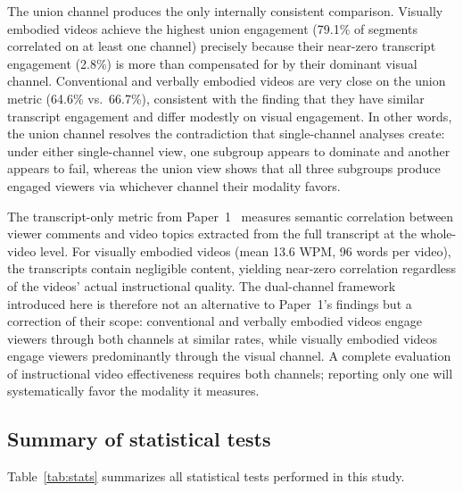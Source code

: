 \documentclass[fleqn,10pt]{wlscirep}
\begin{document}
The union channel produces the only internally consistent comparison. Visually embodied videos achieve the highest union engagement (79.1\% of segments correlated on at least one channel) precisely because their near-zero transcript engagement (2.8\%) is more than compensated for by their dominant visual channel. Conventional and verbally embodied videos are very close on the union metric (64.6\% vs.\ 66.7\%), consistent with the finding that they have similar transcript engagement and differ modestly on visual engagement. In other words, the union channel resolves the contradiction that single-channel analyses create: under either single-channel view, one subgroup appears to dominate and another appears to fail, whereas the union view shows that all three subgroups produce engaged viewers via whichever channel their modality favors.

The transcript-only metric from Paper~1~\cite{zhang2025transcript} measures semantic correlation between viewer comments and video topics extracted from the full transcript at the whole-video level. For visually embodied videos (mean 13.6 WPM, 96 words per video), the transcripts contain negligible content, yielding near-zero correlation regardless of the videos' actual instructional quality. The dual-channel framework introduced here is therefore not an alternative to Paper~1's findings but a correction of their scope: conventional and verbally embodied videos engage viewers through both channels at similar rates, while visually embodied videos engage viewers predominantly through the visual channel. A complete evaluation of instructional video effectiveness requires both channels; reporting only one will systematically favor the modality it measures.


\subsection*{Summary of statistical tests}

Table~\ref{tab:stats} summarizes all statistical tests performed in this study.
\end{document}
